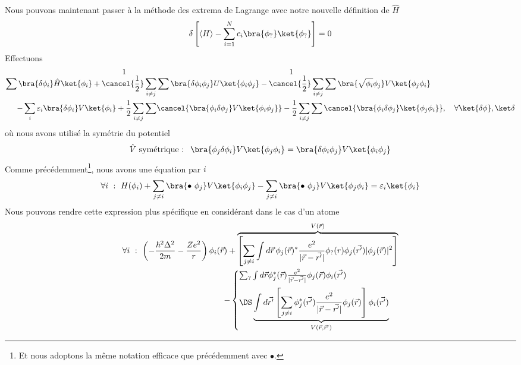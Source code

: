 Nous pouvons maintenant passer à la méthode des extrema de Lagrange avec notre nouvelle définition de $\hat{H}$
\begin{equation}
\delta \left[\left\langle H\right\rangle - \sum_{i=1}^{N} c_i \bra{\phi_?}\ket{\phi_?}\right] = 0
\end{equation}
Effectuons
\begin{equation}
\begin{split}
\sum \bra{\delta\phi_i}\hat H\ket{\phi_i} + \overset{\displaystyle\ 1}{\cancel{\frac{1}{2}}} \sum_{i\neq j} &\sum \bra{\delta\phi_i\phi_j}U\ket{\phi_i\phi_j} - \overset{\displaystyle\ 1}{\cancel{\frac{1}{2}}} \sum_{i\neq j}\sum \bra{\sqrt{\phi_i}\phi_j}V\ket{\phi_j\phi_i}\\
-\sum_i \varepsilon_i\bra{\delta \phi_i}V\ket{\phi_i} +\frac{1}{2}\sum_{i\neq j}\sum &\cancel{\bra{\phi_i\delta\phi_j}V\ket{\phi_i\phi_j}} - \frac{1}{2}\sum_{i \neq j} \sum \cancel{\bra{\phi_i\delta\phi_j}\ket{\phi_j\phi_i}},\quad \forall \ket{\delta\phi},\ket\delta\\
\end{split}
\end{equation}
où nous avons utilisé la symétrie du potentiel
\begin{equation}
\hat V \text{ symétrique : }\ \bra{\phi_j \delta\phi_i}V\ket{\phi_j\phi_i} = \bra{\delta\phi_i\phi_j}V\ket{\phi_i\phi_j}
\end{equation}
Comme précédemment\footnote{Et nous adoptons la même notation efficace que précédemment avec $\bullet$.}, 
nous avons une équation par $i$
\begin{equation}
\forall i\ :\ H(\phi_i) + \sum_{j\neq i}\bra{\bullet\ \phi_j}V\ket{\phi_i\phi_j}- \sum_{j\neq i} \bra{\bullet\ \phi_j}V\ket{\phi_j\phi_i} = \varepsilon_i\ket{\phi_i}
\end{equation}
Nous pouvons rendre cette expression plus spécifique en considérant dans le cas d'un atome
\begin{equation}
\begin{split}
\forall i\ :\ \left(-\frac{\hbar^2\Delta^2}{2m}-\frac{Z e^2}{r}\right)\phi_i(\vec r) + \overbrace{\left[\sum_{j\neq i}\int d\vec r\,\phi_j(\vec r)^*\frac{e^2}{|\vec r - \vec{r'}|}\phi_?(r)\phi_j(\vec {r'}) |\phi_j(\vec r)|^2\right]}^{V(\vec{r})} \\- \begin{cases}
\sum_{?} \int d\vec r \phi_j^*(\vec r)\frac{e^2}{|\vec r - \vec{r'}|} \phi_j(\vec r)\phi_i(\vec{r'})\vspace{2mm}\\
\DS\underbrace{\int d\vec{r'}\left[\sum_{j\neq i} \phi_j^*(\vec{r'})\dfrac{e^2}{|\vec{r}-\vec{r'}|}\phi_j(\vec{r})\right]\phi_i(\vec{r'})}_{V(\vec{r},\vec{r}')}
\end{cases}
\end{split}
\end{equation}
